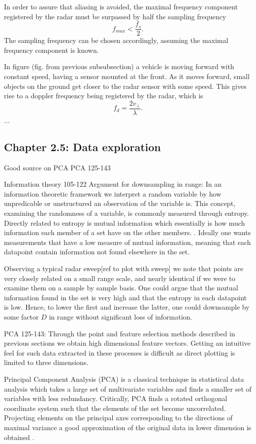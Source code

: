 In order to assure that aliasing is avoided, the maximal frequency component registered by the radar must be surpassed by half the sampling frequency
\begin{equation}
	f_{max} < \frac{f_s}{2}.
\end{equation}
The sampling frequency can be chosen accordingly, assuming the maximal frequency component is known. 

In figure (fig. from previous subsubsection) a vehicle is moving forward with constant speed, having a sensor mounted at the front. As it moves forward, small objects on the ground get closer to the radar sensor with some speed. This gives rise to a doppler frequency being registered by the radar, which is \citep{lien_gillian_karagozler_amihood_schwesig_olson_raja_poupyrev_2016}
\begin{equation}
	f_{d} = \frac{2v_\perp}{\lambda}.
\end{equation}
...


\subsection{Chapter 2.5: Data exploration}

Good source on PCA
\cite{hyvasrinen_karhunen_oja_2004}
PCA 125-143

Information theory
105-122
Argument for downsampling in range: In an information theoretic framework we interpret a random variable by how unpredicable or unstructured an observation of the variable is. This concept, examining the randomness of a variable, is commonly measured through entropy. Directly related to entropy is mutual information which essentially is how much information each member of a set have on the other members. \cite{hyvasrinen_karhunen_oja_2004}. Ideally one wants measurements that have a low measure of mutual information, meaning that each datapoint contain information not found elsewhere in the set. 

Observing a typical radar sweep[ref to plot with sweep] we note that points are very closely related on a small range scale, and nearly identical if we were to examine them on a sample by sample basis. One could argue that the mutual information found in the set is very high and that the entropy in each datapoint is low. Hence, to lower the first and increase the latter, one could downsample by some factor $D$ in range without significant loss of information.


PCA 125-143: Through the point and feature selection methods described in previous sections we obtain high dimensional feature vectors. Getting an intuitive feel for such data extracted in these processes is difficult as direct plotting is limited to three dimensions. 

Principal Component Analysis (PCA) is  a classical technique in statistical data analysis which takes a large set of multivariate variables and finds a smaller set of variables with less redundancy. Critically, PCA finds a rotated orthogonal coordinate system such that the elements of the set become uncorrelated. Projecting elements on the principal axes corresponding to the directions of maximal variance a good approximation of the original data in lower dimension is obtained \citep{hyvasrinen_karhunen_oja_2004}. 
